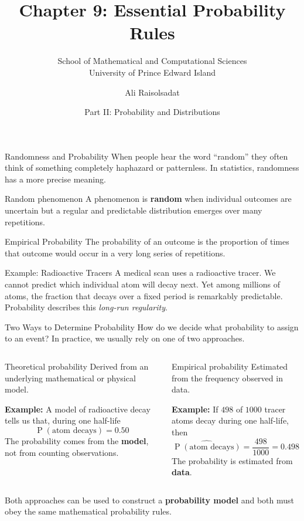 \documentclass[aspectratio=169]{beamer}
\title[Chapter 9: Essential Probability Rules]{\textbf{Chapter 9: Essential Probability Rules}}
\subtitle{School of Mathematical and Computational Sciences \\ University of Prince Edward Island}
\author{Ali Raisolsadat}
\date{Part II: Probability and Distributions}
\newcommand{\prob}[1]{\operatorname{P}\!\left(#1\right)}
\begin{document}
\begin{frame}
  \titlepage
\end{frame}

\begin{frame}{Randomness and Probability}
\small
When people hear the word ``random'' they often think of something completely haphazard or patternless. In statistics, randomness has a more precise meaning.

\vspace{0.2cm}
\begin{block}{Random phenomenon}
A phenomenon is \textbf{random} when individual outcomes are uncertain but a regular and predictable distribution emerges over many repetitions.
\end{block}

\begin{block}{Empirical Probability}
The probability of an outcome is the proportion of times that outcome would occur in a very long series of repetitions.
\end{block}

\begin{exampleblock}{Example: Radioactive Tracers}
A medical scan uses a radioactive tracer. We cannot predict which individual atom will decay next. Yet among millions of atoms, the fraction that decays over a fixed period is remarkably predictable. Probability describes this \emph{long-run regularity}.
\end{exampleblock}
\end{frame}

\begin{frame}{Two Ways to Determine Probability}
How do we decide what probability to assign to an event? In practice, we usually rely on one of two approaches.

\begin{columns}[T,onlytextwidth]
\begin{block}{Theoretical probability}
Derived from an underlying mathematical or physical model.

\textbf{Example:} A model of radioactive decay tells us that, during one half-life $$\prob{\text{atom decays}}=0.50$$
The probability comes from the \textbf{model}, not from counting observations.
\end{block}

\begin{block}{Empirical probability}
Estimated from the frequency observed in data.

\textbf{Example:} If $498$ of $1000$ tracer atoms decay during one half-life, then $$\widehat{\prob{\text{atom decays}}} =\frac{498}{1000}=0.498 $$
The probability is estimated from \textbf{data}.
\end{block}
\end{columns}

\vspace{0.2cm}
Both approaches can be used to construct a \textbf{probability model} and both must obey the same mathematical probability rules.
\end{frame}
\end{document}
